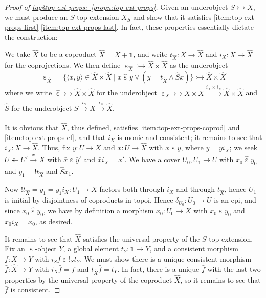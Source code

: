 \documentclass{amsart}
\makeatletter
\newcommand\br[1]{\langle{}#1\rangle{}}
\newcommand\ein{\mathrel{\varepsilon}}
\newcommand\oot{\twoheadleftarrow}
\newcommand\set[2][]{#1\{ #2 #1\}}
\newcommand\tm{\mathbf{1}}
\newcommand\tox[2][]{\xrightarrow[#1]{#2}}
\newcommand\tto{\rightarrowtail}
\newcommand\unein{{\ein}}
\newcommand\unex{{!}}
\newcommand\wh[1]{\widehat{#1}}
\newcommand\tagword[1]{\csname tag@#1\endcsname}
\def\label@tag#1:#2\@nil{#1}
\newcommand\labeltag[1]{\label@tag#1:\@nil}
\newcommand\jref[1]{%
  \texorpdfstring%
    {\hyperref[#1]{\tagword{\labeltag{#1}}~\ref*{#1}}}%
    {\tagword{\labeltag{#1}}~\ref*{#1}}%
}
\theoremstyle{definition}
\theoremstyle{remark}
\theoremstyle{plainwithref}
\makeatother
\begin{document}
\begin{proof}[Proof of \jref{propn:top-ext-props}] \label{proof:top-ext-props}
  Given an underobject \( S \tto X \), we must produce an \( S \)-top extension \( X_S \) and show that it satisfies \ref{item:top-ext-props-first}-\ref{item:top-ext-props-last}.
  In fact, these properties essentially dictate the construction:

  We take \( \wh X \) to be a coproduct \( \wh X = X + \tm \), and write \( t_{\wh X} \colon X \to \wh X \) and \( i_X \colon X \to \wh X \) for the coprojections.
  We then define \( \unein_{\wh X} \tto \wh X \times \wh X \) as the underobject
  \[
    \unein_{\wh X} =
    \set{ \br{x, y} \in \wh X \times \wh X \mid
      x \mathrel{\wh{\ein}} y \vee (y = t_{\wh X} \wedge \wh S x)
    }
    \tto \wh X \times \wh X
  \]
  where we write \( \wh{\unein} \tto \wh X \times \wh X \) for the underobject \( \unein_X \tto X \times X \tox{i_X \times i_X} \wh X \times \wh X \) and \( \wh S \) for the underobject \( S \tox{i_S} X \tox{i_X} \wh X \).

  It is obvious that \( \wh X \), thus defined, satisfies \ref{item:top-ext-props-coprod} and \ref{item:top-ext-props-el}, and that \( i_X \) is monic and consistent; it remains to see that \( i_X \colon X \to \wh X \).
  Thus, fix \( \bar y \colon U \to X \) and \( x \colon U \to \wh X \) with \( x \ein y \), where \( y = \bar y i_X \); we seek \( U \oot U' \tox{\bar x} X \) with \( \bar x \ein \bar y' \) and \( \bar x i_X = x' \).
  We have a cover \( U_0,U_1 \to U \) with \( x_0 \mathrel{\wh\ein} y_0 \) and \( y_1 = \unex t_{\wh X} \) and \( \wh S x_1 \).

  Now \( \unex t_{\wh X} = y_1 = \bar y_1 i_X \colon U_1 \to X \) factors both through \( i_X \) and through \( t_{\wh X} \), hence \( U_1 \) is initial by disjointness of coproducts in topoi.
  Hence \( \delta_{U_0} \colon U_0 \to U \) is an epi, and since \( x_0 \mathrel{\wh\ein} y_0 \), we have by definition a morphism \( \bar x_0 \colon U_0 \to X \) with \( \bar x_0 \ein \bar y_0 \) and \( \bar x_0 i_X = x_0 \), as desired.

  It remains to see that \( \wh X \) satisfies the universal property of the \( S \)-top extension.
  Fix an \( \unein \)-object \( Y \), a global element \( t_Y \colon \tm \to Y \), and a consistent morphism \( f \colon X \to Y \) with \( i_S f \ein \unex_S t_Y \).
  We must show there is a unique consistent morphism \( \bar f \colon \wh X \to Y \) with \( i_X \bar f = f \) and \( t_{\wh X} \bar f = t_Y \).
  In fact, there is a unique \( \bar f \) with the last two properties by the universal property of the coproduct \( \wh X \), so it remains to see that \( \bar f \) is consistent.


\end{proof}
\end{document}
